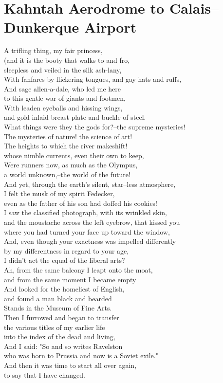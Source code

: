 \documentclass[smalldemyvopaper,11pt,twoside,onecolumn,openright,extrafontsizes]{memoir}
\begin{document}
\chapter{Kahntah Aerodrome to Calais–Dunkerque Airport}
A trifling thing, my fair princess,
\\(and it is the booty that walks to and fro,
\\sleepless and veiled in the silk ash-lany,
\\With fanfares by flickering tongues, and gay hats and ruffs,
\\And sage allen-a-dale, who led me here
\\to this gentle war of giants and footmen,
\\With leaden eyeballs and hissing wings,
\\and gold-inlaid breast-plate and buckle of steel.
\\What things were they the gods for?--the supreme mysteries!
\\The mysteries of nature! the science of art!
\\The heights to which the river makeshift!
\\whose nimble currents, even their own to keep,
\\Were runners now, as much as the Olympus,
\\a world unknown,--the world of the future!
\\And yet, through the earth's silent, star--less atmosphere,
\\I felt the musk of my spirit Fedecker,
\\even as the father of his son had doffed his cookies!
\\I saw the classified photograph, with its wrinkled skin,
\\and the moustache across the left eyebrow, that kissed you
\\where you had turned your face up toward the window,
\\And, even though your exactness was impelled differently
\\by my differentness in regard to your age,
\\I didn't act the equal of the liberal arts?
\\Ah, from the same balcony I leapt onto the moat,
\\and from the same moment I became empty
\\And looked for the homeliest of English,
\\and found a man black and bearded
\\Stands in the Museum of Fine Arts.
\\Then I furrowed and began to transfer
\\the various titles of my earlier life
\\into the index of the dead and living,
\\And I said: "So and so writes Ravelston
\\who was born to Prussia and now is a Soviet exile."
\\And then it was time to start all over again,
\\to say that I have changed.
\end{document}
